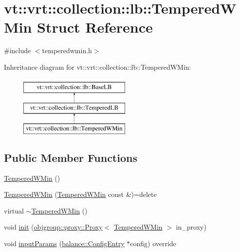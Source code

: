 \hypertarget{structvt_1_1vrt_1_1collection_1_1lb_1_1_tempered_w_min}{}\section{vt\+:\+:vrt\+:\+:collection\+:\+:lb\+:\+:Tempered\+W\+Min Struct Reference}
\label{structvt_1_1vrt_1_1collection_1_1lb_1_1_tempered_w_min}


{\ttfamily \#include $<$temperedwmin.\+h$>$}

Inheritance diagram for vt\+:\+:vrt\+:\+:collection\+:\+:lb\+:\+:Tempered\+W\+Min\+:\begin{figure}[H]
\begin{center}
\leavevmode
\includegraphics[height=3.000000cm]{structvt_1_1vrt_1_1collection_1_1lb_1_1_tempered_w_min}
\end{center}
\end{figure}
\subsection*{Public Member Functions}
\begin{DoxyCompactItemize}
\item 
\hyperlink{structvt_1_1vrt_1_1collection_1_1lb_1_1_tempered_w_min_a0651609fa1544383a93ef8c178be4780}{Tempered\+W\+Min} ()
\item 
\hyperlink{structvt_1_1vrt_1_1collection_1_1lb_1_1_tempered_w_min_a757b4b20c43d657d4ceba856c3da13ee}{Tempered\+W\+Min} (\hyperlink{structvt_1_1vrt_1_1collection_1_1lb_1_1_tempered_w_min}{Tempered\+W\+Min} const \&)=delete
\item 
virtual \hyperlink{structvt_1_1vrt_1_1collection_1_1lb_1_1_tempered_w_min_a7225191709849520f021c6a5df9f26ba}{$\sim$\+Tempered\+W\+Min} ()
\item 
void \hyperlink{structvt_1_1vrt_1_1collection_1_1lb_1_1_tempered_w_min_a4568be2f1baa683968308e48a0743dea}{init} (\hyperlink{structvt_1_1objgroup_1_1proxy_1_1_proxy}{objgroup\+::proxy\+::\+Proxy}$<$ \hyperlink{structvt_1_1vrt_1_1collection_1_1lb_1_1_tempered_w_min}{Tempered\+W\+Min} $>$ in\+\_\+proxy)
\item 
void \hyperlink{structvt_1_1vrt_1_1collection_1_1lb_1_1_tempered_w_min_a0dd469ab6f3f8aebebf55c773df099ce}{input\+Params} (\hyperlink{structvt_1_1vrt_1_1collection_1_1balance_1_1_config_entry}{balance\+::\+Config\+Entry} $\ast$config) override
\end{DoxyCompactItemize}

